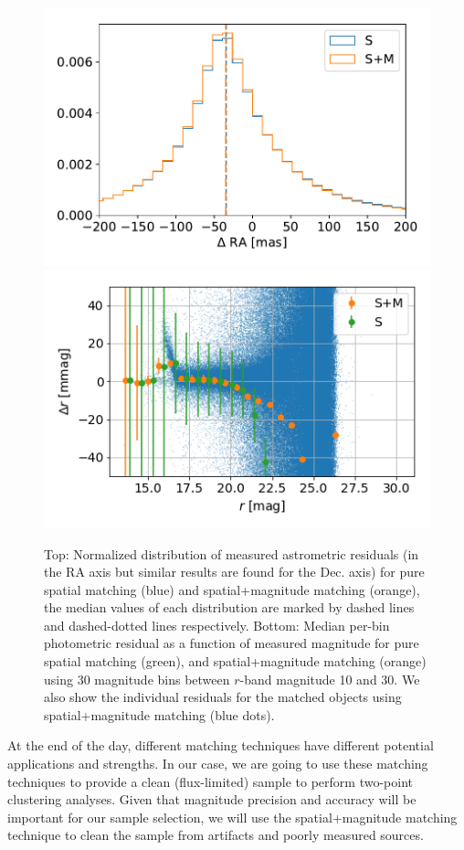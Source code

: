 \documentclass[twocolumn]{aastex62}
\begin{document}
\begin{figure}
\centering
\includegraphics[width=0.9\columnwidth]{astrometry_residual_comparison}
\includegraphics[width=0.9\columnwidth]{photometry_residual_comparison}
\caption{Top: Normalized distribution of measured astrometric residuals (in the RA axis but similar results are found for the Dec. axis) for pure spatial matching (blue) and spatial+magnitude matching (orange), the median values of each distribution are marked by dashed lines and dashed-dotted lines respectively. Bottom: Median per-bin photometric residual as a function of measured magnitude for pure spatial matching (green), and spatial+magnitude matching (orange) using 30 magnitude bins between $r$-band magnitude 10 and 30. We also show the individual residuals for the matched objects using spatial+magnitude matching (blue dots).}
\label{fig:matching_comparison}
\end{figure}

At the end of the day, different matching techniques have different potential applications and strengths. In our case, we are going to use these matching techniques to provide a clean (flux-limited) sample to perform two-point clustering analyses. Given that magnitude precision and accuracy will be important for our sample selection, we will use the spatial+magnitude matching technique to clean the sample from artifacts and poorly measured sources.
\end{document}
